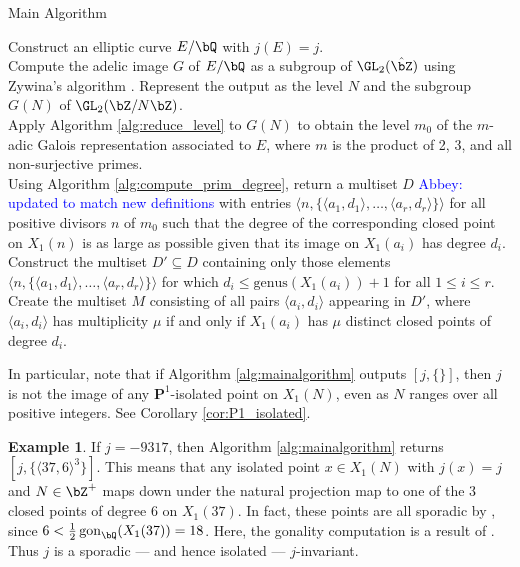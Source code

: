 \documentclass[11pt,reqno]{amsart}
\theoremstyle{plain}
\theoremstyle{definition}
\newtheorem{example}[theorem]{Example}
\DeclareMathOperator{\gon}{gon}
\newcommand{\Q}{\bQ}
\newcommand{\Z}{\bZ}
\newcommand{\abbey}[1]{\textcolor{blue}{Abbey: #1}}
\begin{document}
\setcounter{algocf}{0}
\begin{algorithm}[h!]
\caption{Main Algorithm}\label{alg:mainalgorithm}
\KwIn{A non-CM $j$-invariant $j \in \Q$.}
Construct an elliptic curve $E/\Q$ with $j(E)=j$.\\
Compute the adelic image $G$ of $E/\Q$ as a subgroup of $\GL_2(\hat{\Z})$ using Zywina's algorithm \cite{ZywinaAlgorithm}. Represent the output as the level $N$ and the subgroup $G(N)$ of $\GL_2(\Z/N\Z)$.\\
Apply Algorithm \ref{alg:reduce_level} to $G(N)$ to obtain the level $m_0$ of the $m$-adic Galois representation associated to $E$, where $m$ is the product of 2, 3, and all non-surjective primes.\\
Using Algorithm \ref{alg:compute_prim_degree}, return a multiset $D$ \abbey{updated to match new definitions} with entries $\langle n, \{\langle a_1, d_1\rangle ,  \dots,  \langle a_r, d_r\rangle \} \rangle$
    for all positive divisors $n$ of $m_0$ such that the degree of the corresponding 
    closed point on $X_1(n)$ is as large as possible given that its image on $X_1(a_i) $
    has degree $d_i$.\\
Construct the multiset $D' \subseteq D$ containing only those elements $\langle n, \{\langle a_1, d_1\rangle ,  \dots,  \langle a_r, d_r\rangle \} \rangle$ for which $d_i \leq \text{genus}(X_1(a_i))+1$ for all $1 \leq i \leq r$.\\
Create the multiset $M$ consisting of all pairs $\langle a_i,d_i\rangle $ appearing in $D'$, where $\langle a_i,d_i\rangle $ has multiplicity $\mu$ if and only if $X_1(a_i)$ has $\mu$ distinct closed points of degree $d_i$.\\
\Return{$[j,M]$} 

\end{algorithm}

In particular, note that if Algorithm \ref{alg:mainalgorithm} outputs $[j,\{\}]$, then $j$ is not the image of any $\mathbf{P}^1$-isolated point on $X_1(N)$, even as $N$ ranges over all positive integers. See Corollary \ref{cor:P1_isolated}.

\begin{example}
If $j=-9317$, then Algorithm \ref{alg:mainalgorithm} returns $[j, \{\langle 37,6\rangle ^3\}]$. This means that any isolated point $x\in X_1(N)$ with $j(x)=j$ and $N \in \Z^+$ maps down under the natural projection map to one of the 3 closed points of degree 6 on $X_1(37)$. In fact, these points are all sporadic by \cite[Proposition 2]{frey}, since $6 < \frac{1}{2} \gon_{\Q}(X_1(37)) = 18$. Here, the gonality computation is a result of \cite{DerickxVanHoeij2014}. Thus $j$ is a sporadic --- and hence isolated --- $j$-invariant.
\end{example}
\end{document}
